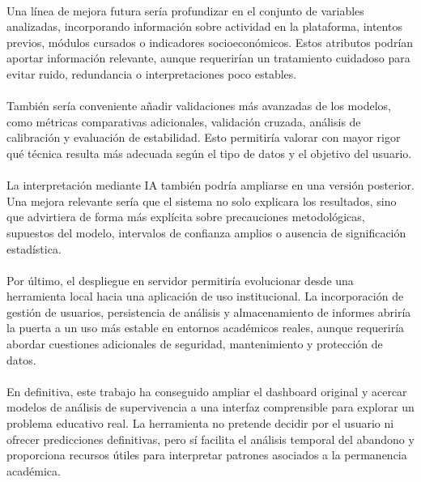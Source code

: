 \paragraph*{}Una línea de mejora futura sería profundizar en el conjunto de variables analizadas, incorporando información sobre actividad en la plataforma, intentos previos, módulos cursados o indicadores socioeconómicos. Estos atributos podrían aportar información relevante, aunque requerirían un tratamiento cuidadoso para evitar ruido, redundancia o interpretaciones poco estables.

\paragraph*{}También sería conveniente añadir validaciones más avanzadas de los modelos, como métricas comparativas adicionales, validación cruzada, análisis de calibración y evaluación de estabilidad. Esto permitiría valorar con mayor rigor qué técnica resulta más adecuada según el tipo de datos y el objetivo del usuario.

\paragraph*{}La interpretación mediante IA también podría ampliarse en una versión posterior. Una mejora relevante sería que el sistema no solo explicara los resultados, sino que advirtiera de forma más explícita sobre precauciones metodológicas, supuestos del modelo, intervalos de confianza amplios o ausencia de significación estadística.

\paragraph*{}Por último, el despliegue en servidor permitiría evolucionar desde una herramienta local hacia una aplicación de uso institucional. La incorporación de gestión de usuarios, persistencia de análisis y almacenamiento de informes abriría la puerta a un uso más estable en entornos académicos reales, aunque requeriría abordar cuestiones adicionales de seguridad, mantenimiento y protección de datos.

\paragraph*{}En definitiva, este trabajo ha conseguido ampliar el dashboard original y acercar modelos de análisis de supervivencia a una interfaz comprensible para explorar un problema educativo real. La herramienta no pretende decidir por el usuario ni ofrecer predicciones definitivas, pero sí facilita el análisis temporal del abandono y proporciona recursos útiles para interpretar patrones asociados a la permanencia académica.
